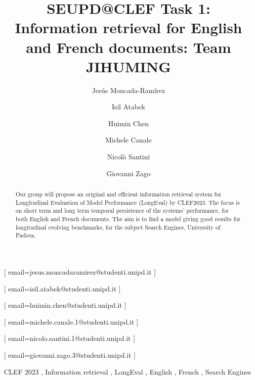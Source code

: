 \documentclass{ceurart}
\begin{document}


\title{SEUPD@CLEF Task 1: Information retrieval for English and French
documents: Team JIHUMING}

\author[1]{Jes\'us Moncada-Ram\'irez}[%
email=jesus.moncadaramirez@studenti.unipd.it
]

\author[1]{Isil Atabek}[%
email=isil.atabek@studenti.unipd.it
]

\author[1]{Huimin Chen}[%
email=huimin.chen@studenti.unipd.it
]

\author[1]{Michele	Canale}[%
email=michele.canale.1@studenti.unipd.it
]

\author[1]{Nicol\`o Santini}[%
email=nicolo.santini.1@studenti.unipd.it
]

\author[1]{Giovanni Zago}[%
email=giovanni.zago.3@studenti.unipd.it
]


\begin{abstract}
  Our group will propose an original and efficient information retrieval
  system for Longitudinal Evaluation of Model Performance (LongEval)
  by CLEF2023\cite{LongEval}. The focus is on short term and long term
  temporal persistence of the systems'  performance,
  for both English and French documents. The aim is to find a model giving
  good results for longitudinal evolving benchmarks,
  for the subject Search Engines, University of Padova.
\end{abstract}

\begin{keywords}
  CLEF 2023 \sep
  Information retrieval \sep
  LongEval \sep
  English \sep
  French \sep
  Search Engines
\end{keywords}
\end{document}
